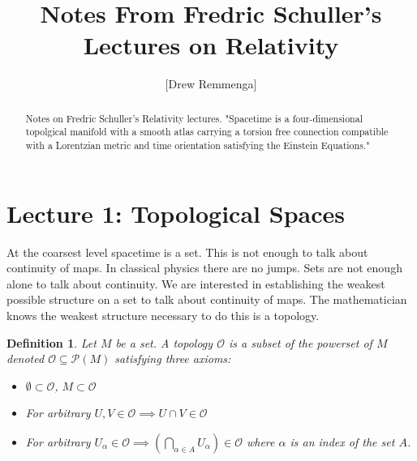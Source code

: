 \documentclass[10pt, oneside]{article}
\title{Notes From Fredric Schuller's Lectures on Relativity}
\author{[Drew Remmenga]}
\newtheorem{defn}{Definition}
\begin{document}
\maketitle
\begin{abstract}
   Notes on Fredric Schuller's Relativity lectures. "Spacetime is a four-dimensional topolgical manifold with a smooth atlas carrying a torsion free connection compatible with a Lorentzian metric and time orientation satisfying the Einstein Equations."
\end{abstract}
\section{Lecture 1: Topological Spaces \cite{Topology}}
  At the coarsest level spacetime is a set. This is not enough to talk about continuity of maps. In classical physics there are no jumps. Sets are not enough alone to talk about continuity. We are interested in establishing the weakest possible structure on a set to talk about continuity of maps.
  The mathematician knows the weakest structure necessary to do this is a topology.
  \begin{defn}
      Let $M$ be a set. A topology $\mathcal{O}$ is a subset of the powerset of $M$ denoted $\mathcal{O} \subseteq \mathcal{P}(M)$ satisfying three axioms:
     \begin{itemize}
        \item $\emptyset \subset \mathcal{O}$, $M \subset \mathcal{O}$
        \item For arbitrary $U, V \in \mathcal{O} \implies U \cap V \in \mathcal{O}$
        \item For arbitrary $U_\alpha \in \mathcal{O} \implies (\bigcap_{\alpha \in A} U_\alpha) \in \mathcal{O}$ where $\alpha$ is an index of the set $A$.
     \end{itemize}
  \end{defn}
\end{document}
